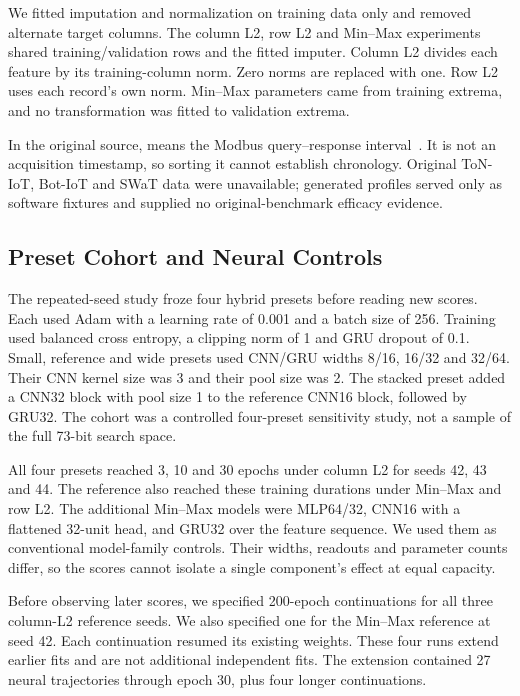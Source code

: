 We fitted imputation and normalization on training data only and removed alternate target columns. The column L2, row L2 and Min--Max experiments shared training/validation rows and the fitted imputer. Column L2 divides each feature by its training-column norm. Zero norms are replaced with one. Row L2 uses each record's own norm. Min--Max parameters came from training extrema, and no transformation was fitted to validation extrema.

In the original source,  means the Modbus query--response interval~\cite{morris2014}. It is not an acquisition timestamp, so sorting it cannot establish chronology. Original ToN-IoT, Bot-IoT and SWaT data were unavailable; generated profiles served only as software fixtures and supplied no original-benchmark efficacy evidence.

\subsection{Preset Cohort and Neural Controls}
The repeated-seed study froze four hybrid presets before reading new scores. Each used Adam with a learning rate of 0.001 and a batch size of 256. Training used balanced cross entropy, a clipping norm of 1 and GRU dropout of 0.1. Small, reference and wide presets used CNN/GRU widths 8/16, 16/32 and 32/64. Their CNN kernel size was 3 and their pool size was 2. The stacked preset added a CNN32 block with pool size 1 to the reference CNN16 block, followed by GRU32. The cohort was a controlled four-preset sensitivity study, not a sample of the full 73-bit search space.

All four presets reached 3, 10 and 30 epochs under column L2 for seeds 42, 43 and 44. The reference also reached these training durations under Min--Max and row L2. The additional Min--Max models were MLP64/32, CNN16 with a flattened 32-unit head, and GRU32 over the feature sequence. We used them as conventional model-family controls. Their widths, readouts and parameter counts differ, so the scores cannot isolate a single component's effect at equal capacity.

Before observing later scores, we specified 200-epoch continuations for all three column-L2 reference seeds. We also specified one for the Min--Max reference at seed 42. Each continuation resumed its existing weights. These four runs extend earlier fits and are not additional independent fits. The extension contained 27 neural trajectories through epoch 30, plus four longer continuations.

